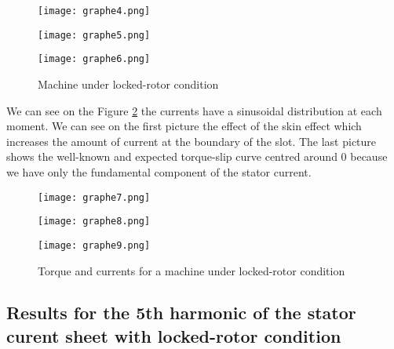 \begin{figure}[H]
    \begin{minipage}{.3 \textwidth}
        \texttt{[image: graphe4.png]}
    \end{minipage}
    \begin{minipage}{.3 \textwidth}
        \texttt{[image: graphe5.png]}
        
    \end{minipage}
    \begin{minipage}{.3 \textwidth}
        \texttt{[image: graphe6.png]}
    \end{minipage}
    \caption{Machine under locked-rotor condition}
    \label{fig:locked}
    
\end{figure}
We can see on the Figure \ref{fig:locked2} the currents have a sinusoidal distribution at each moment. We can see on the first picture the effect of the skin effect which increases the amount of current at the boundary of the slot. The last picture shows the well-known and expected torque-slip curve centred around 0 because we have only the fundamental component of the stator current. 
\begin{figure}[H]
    \begin{minipage}{.3 \textwidth}
        \texttt{[image: graphe7.png]}
    \end{minipage}
    \begin{minipage}{.3 \textwidth}
        \texttt{[image: graphe8.png]}
        
    \end{minipage}
    \begin{minipage}{.3 \textwidth}
        \texttt{[image: graphe9.png]}
    \end{minipage}
    \caption{Torque and currents for a machine under locked-rotor condition}
    \label{fig:locked2}
    
\end{figure}



\subsection{Results for the 5th harmonic of the stator curent sheet with locked-rotor condition}

